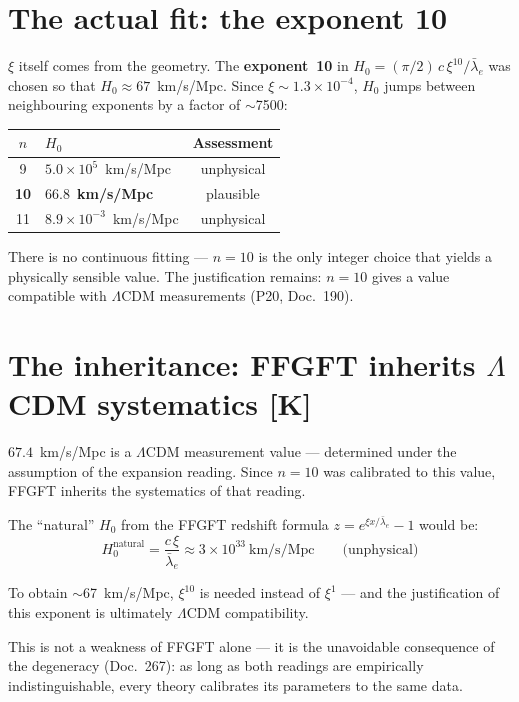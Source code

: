 \section{The actual fit: the exponent 10}

$\xi$ itself comes from the geometry. The \textbf{exponent~10} in
$H_0 = (\pi/2)\,c\,\xi^{10}/\bar\lambda_e$ was chosen so that
$H_0 \approx 67$~km/s/Mpc. Since $\xi \sim 1.3\times10^{-4}$,
$H_0$ jumps between neighbouring exponents by a factor of $\sim$7500:

\begin{center}
\begin{tabular}{clc}
\toprule
$n$ & $H_0$ & Assessment \\
\midrule
9  & $5.0\times10^5$~km/s/Mpc & unphysical \\
\textbf{10} & $\mathbf{66.8}$~\textbf{km/s/Mpc} & plausible \\
11 & $8.9\times10^{-3}$~km/s/Mpc & unphysical \\
\bottomrule
\end{tabular}
\end{center}

There is no continuous fitting — $n=10$ is the only integer choice that
yields a physically sensible value. The justification remains: $n=10$
gives a value compatible with $\Lambda$CDM measurements (P20, Doc.~190).

\section{The inheritance: FFGFT inherits $\Lambda$CDM systematics [K]}

$67.4$~km/s/Mpc is a $\Lambda$CDM measurement value — determined under
the assumption of the expansion reading. Since $n=10$ was calibrated to
this value, FFGFT inherits the systematics of that reading.

The ``natural'' $H_0$ from the FFGFT redshift formula
$z = e^{\xi x/\bar\lambda_e} - 1$ would be:
\[
  H_0^\text{natural} = \frac{c\,\xi}{\bar\lambda_e}
  \approx 3\times10^{33}~\text{km/s/Mpc}
  \qquad\text{(unphysical)}
\]

To obtain $\sim$67~km/s/Mpc, $\xi^{10}$ is needed instead of $\xi^1$
— and the justification of this exponent is ultimately
$\Lambda$CDM compatibility.

This is not a weakness of FFGFT alone — it is the unavoidable
consequence of the degeneracy (Doc.~267): as long as both readings are
empirically indistinguishable, every theory calibrates its parameters
to the same data.

